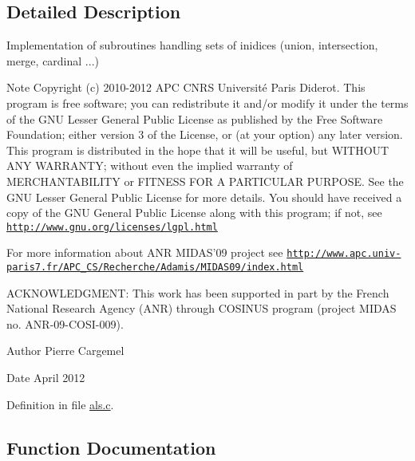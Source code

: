 \subsection{Detailed Description}
Implementation of subroutines handling sets of inidices (union, intersection, merge, cardinal ...) \begin{DoxyNote}{Note}
Copyright (c) 2010-\/2012 A\-P\-C C\-N\-R\-S Université Paris Diderot. This program is free software; you can redistribute it and/or modify it under the terms of the G\-N\-U Lesser General Public License as published by the Free Software Foundation; either version 3 of the License, or (at your option) any later version. This program is distributed in the hope that it will be useful, but W\-I\-T\-H\-O\-U\-T A\-N\-Y W\-A\-R\-R\-A\-N\-T\-Y; without even the implied warranty of M\-E\-R\-C\-H\-A\-N\-T\-A\-B\-I\-L\-I\-T\-Y or F\-I\-T\-N\-E\-S\-S F\-O\-R A P\-A\-R\-T\-I\-C\-U\-L\-A\-R P\-U\-R\-P\-O\-S\-E. See the G\-N\-U Lesser General Public License for more details. You should have received a copy of the G\-N\-U General Public License along with this program; if not, see \href{http://www.gnu.org/licenses/lgpl.html}{\tt http\-://www.\-gnu.\-org/licenses/lgpl.\-html} 

For more information about A\-N\-R M\-I\-D\-A\-S'09 project see \href{http://www.apc.univ-paris7.fr/APC_CS/Recherche/Adamis/MIDAS09/index.html}{\tt http\-://www.\-apc.\-univ-\/paris7.\-fr/\-A\-P\-C\-\_\-\-C\-S/\-Recherche/\-Adamis/\-M\-I\-D\-A\-S09/index.\-html} 

A\-C\-K\-N\-O\-W\-L\-E\-D\-G\-M\-E\-N\-T\-: This work has been supported in part by the French National Research Agency (A\-N\-R) through C\-O\-S\-I\-N\-U\-S program (project M\-I\-D\-A\-S no. A\-N\-R-\/09-\/\-C\-O\-S\-I-\/009). 
\end{DoxyNote}
\begin{DoxyAuthor}{Author}
Pierre Cargemel 
\end{DoxyAuthor}
\begin{DoxyDate}{Date}
April 2012 
\end{DoxyDate}


Definition in file \hyperlink{als_8c_source}{als.\-c}.



\subsection{Function Documentation}
